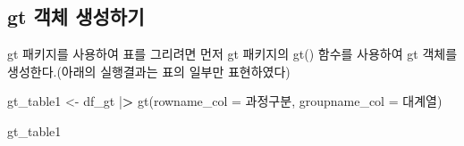 \documentclass[
]{article}
\newenvironment{Shaded}{\begin{snugshade}}{\end{snugshade}}
\newcommand{\AttributeTok}[1]{\textcolor[rgb]{0.77,0.63,0.00}{#1}}
\newcommand{\ErrorTok}[1]{\textcolor[rgb]{0.64,0.00,0.00}{\textbf{#1}}}
\newcommand{\FunctionTok}[1]{\textcolor[rgb]{0.00,0.00,0.00}{#1}}
\newcommand{\NormalTok}[1]{#1}
\newcommand{\OtherTok}[1]{\textcolor[rgb]{0.56,0.35,0.01}{#1}}
\newcommand{\SpecialCharTok}[1]{\textcolor[rgb]{0.00,0.00,0.00}{#1}}
\newcommand{\StringTok}[1]{\textcolor[rgb]{0.31,0.60,0.02}{#1}}
\begin{document}
\hypertarget{gt-uxac1duxccb4-uxc0dduxc131uxd558uxae30}{%
\subsection{gt 객체
생성하기}\label{gt-uxac1duxccb4-uxc0dduxc131uxd558uxae30}}

gt 패키지를 사용하여 표를 그리려면 먼저 gt 패키지의 gt() 함수를 사용하여
gt 객체를 생성한다.(아래의 실행결과는 표의 일부만 표현하였다)

\begin{Shaded}
\begin{Highlighting}[]
\NormalTok{gt\_table1 }\OtherTok{\textless{}{-}}\NormalTok{ df\_gt }\SpecialCharTok{|}\ErrorTok{\textgreater{}}
  \FunctionTok{gt}\NormalTok{(}\AttributeTok{rowname\_col =} \StringTok{\textquotesingle{}과정구분\textquotesingle{}}\NormalTok{, }
     \AttributeTok{groupname\_col =} \StringTok{\textquotesingle{}대계열\textquotesingle{}}\NormalTok{)}

\NormalTok{gt\_table1}
\end{Highlighting}
\end{Shaded}
\end{document}
